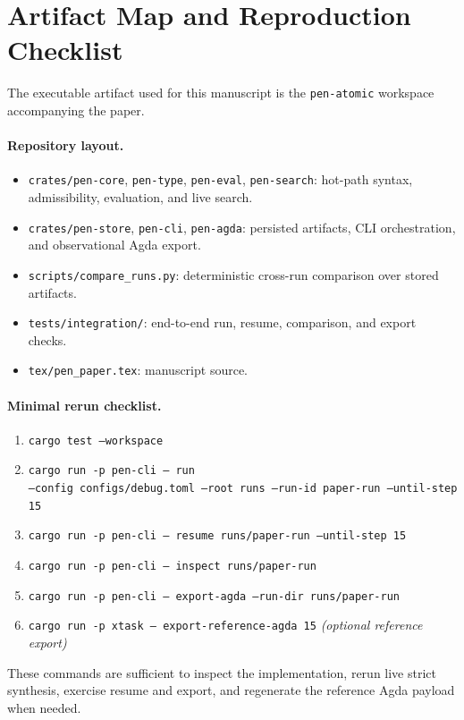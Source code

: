 \documentclass[11pt,a4paper]{article}
\theoremstyle{plain}
\theoremstyle{definition}
\theoremstyle{remark}
\begin{document}
\section{Artifact Map and Reproduction Checklist}
\label{app:artifact-map}

The executable artifact used for this manuscript is the \texttt{pen-atomic} workspace accompanying the paper.

\paragraph{Repository layout.}
\begin{itemize}[nosep]
    \item \texttt{crates/pen-core}, \texttt{pen-type}, \texttt{pen-eval}, \texttt{pen-search}: hot-path syntax, admissibility, evaluation, and live search.
    \item \texttt{crates/pen-store}, \texttt{pen-cli}, \texttt{pen-agda}: persisted artifacts, CLI orchestration, and observational Agda export.
    \item \texttt{scripts/compare\_runs.py}: deterministic cross-run comparison over stored artifacts.
    \item \texttt{tests/integration/}: end-to-end run, resume, comparison, and export checks.
    \item \texttt{tex/pen\_paper.tex}: manuscript source.
\end{itemize}

\paragraph{Minimal rerun checklist.}
\begin{enumerate}[nosep]
    \item \texttt{cargo test --workspace}
    \item \texttt{cargo run -p pen-cli -- run}\\
    \texttt{--config configs/debug.toml --root runs --run-id paper-run --until-step 15}
    \item \texttt{cargo run -p pen-cli -- resume runs/paper-run --until-step 15}
    \item \texttt{cargo run -p pen-cli -- inspect runs/paper-run}
    \item \texttt{cargo run -p pen-cli -- export-agda --run-dir runs/paper-run}
    \item \texttt{cargo run -p xtask -- export-reference-agda 15} \textit{(optional reference export)}
\end{enumerate}
These commands are sufficient to inspect the implementation, rerun live strict synthesis, exercise resume and export, and regenerate the reference Agda payload when needed.
\end{document}
